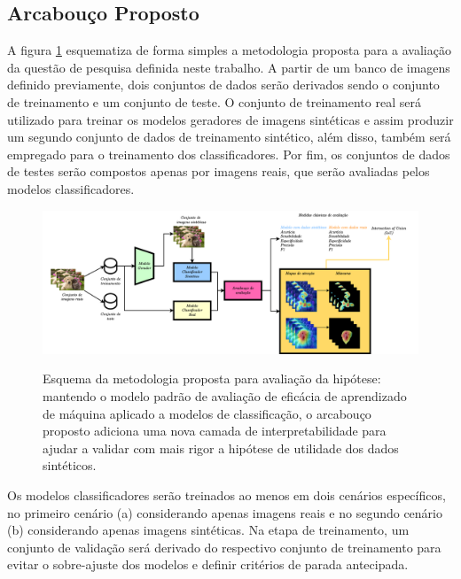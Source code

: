 \subsection{Arcabouço Proposto} \label{secao:arcabouco}

A figura \ref{fig:arcabouco-proposto} esquematiza de forma simples a metodologia proposta para a avaliação da questão de pesquisa definida neste trabalho.
A partir de um banco de imagens definido previamente, dois conjuntos de dados serão derivados sendo o conjunto de treinamento e um conjunto de teste. O conjunto de treinamento real será utilizado para treinar os modelos geradores de imagens sintéticas e assim produzir um segundo conjunto de dados de treinamento sintético, além disso, também será empregado para o treinamento dos classificadores. Por fim, os conjuntos de dados de testes serão compostos apenas por imagens reais, que serão avaliadas pelos modelos classificadores.

\begin{figure}[htbp]
	\centering
	\caption[Esquema da metodologia proposta para avaliação da hipótese]{Esquema da metodologia proposta para avaliação da hipótese: mantendo o modelo padrão de avaliação de eficácia de aprendizado de máquina aplicado a modelos de classificação, o arcabouço proposto adiciona uma nova camada de interpretabilidade para ajudar a validar com mais rigor a hipótese de utilidade dos dados sintéticos.}
		\includegraphics[scale=.19]{imagens/arcabouco-proposto.png}
	\label{fig:arcabouco-proposto}
\end{figure}

Os modelos classificadores serão treinados ao menos em dois cenários específicos, no primeiro cenário (a) considerando apenas imagens reais e no segundo cenário (b) considerando apenas imagens sintéticas. Na etapa de treinamento, um conjunto de validação será derivado do respectivo conjunto de treinamento para evitar o sobre-ajuste dos modelos e definir critérios de parada antecipada.

